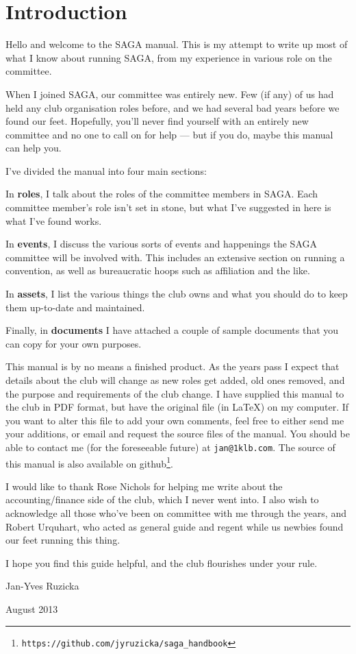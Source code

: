\chapter*{Introduction}

Hello and welcome to the SAGA manual. This is my attempt to write up most of what I know about running SAGA, from my experience in various role on the committee.

When I joined SAGA, our committee was entirely new. Few (if any) of us had held any club organisation roles before, and we had several bad years before we found our feet. Hopefully, you'll never find yourself with an entirely new committee and no one to call on for help --- but if you do, maybe this manual can help you.

I've divided the manual into four main sections:

In \textbf{roles}, I talk about the roles of the committee members in SAGA. Each committee member's role isn't set in stone, but what I've suggested in here is what I've found works.

In \textbf{events}, I discuss the various sorts of events and happenings the SAGA committee will be involved with. This includes an extensive section on running a convention, as well as bureaucratic hoops such as affiliation and the like.

In \textbf{assets}, I list the various things the club owns and what you should do to keep them up-to-date and maintained.

Finally, in \textbf{documents} I have attached a couple of sample documents that you can copy for your own purposes.

This manual is by no means a finished product. As the years pass I expect that details about the club will change as new roles get added, old ones removed, and the purpose and requirements of the club change. I have supplied this manual to the club in PDF format, but have the original file (in \LaTeX) on my computer. If you want to alter this file to add your own comments, feel free to either send me your additions, or email and request the source files of the manual. You should be able to contact me (for the foreseeable future) at \texttt{jan@1klb.com}. The source of this manual is also available on github\footnote{\texttt{https://github.com/jyruzicka/saga\_handbook}}.

I would like to thank Rose Nichols for helping me write about the accounting/finance side of the club, which I never went into. I also wish to acknowledge all those who've been on committee with me through the years, and Robert Urquhart, who acted as general guide and regent while us newbies found our feet running this thing.

I hope you find this guide helpful, and the club flourishes under your rule.

\vspace{3em}

\hfill Jan-Yves Ruzicka

\hfill August 2013